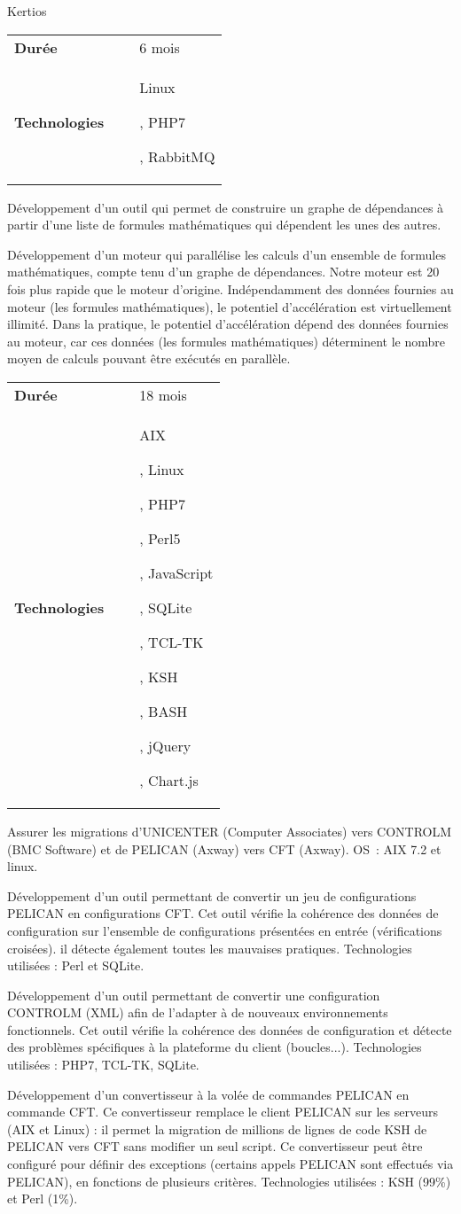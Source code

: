 \documentclass{cv}
\newlength{\hlengthCompanySection}
\newlength{\vlengthSectionTitleContent}
\newcommand{\fontTechnoDef}{\setmainfont[Ligatures=TeX]{Ubuntu Mono}}
\newenvironment{sectionComponent}{%
   \vspace{\vlengthSectionTitleContent}\par%
}{%
   \par%
}%
\newcommand{\realisationHeader}[2]{%
   \vspace{10pt}\par%
   \begin{tcolorbox}[notitle,
                     nobeforeafter, %
                     bottomrule=0pt,
                     toprule=0pt,
                     leftrule=2pt,
                     rightrule=0pt,
                     top=0pt,
                     bottom=0pt,
                     halign=left,
                     left=0pt,
                     valign=center,
                     width=\textwidth,
                     colback=white]%
      \begin{packed_tabular}%
         \begin{tabular}{lll}%
            \textbf{Durée}        & ~ & #1 \\
            \textbf{Technologies} & ~ & #2 \\
         \end{tabular}%
      \end{packed_tabular}%
   \end{tcolorbox}%
   \par%
}%
\newcommand{\sectionCompany}[1]{%
   \vspace{\vlengthSectionTitleContent}\par%
   \hspace{\hlengthCompanySection}\begin{tcolorbox}[notitle,
                      nobeforeafter, %
                      bottomrule=2pt,
                      toprule=0pt,
                      leftrule=0pt,
                      rightrule=0pt,
                      top=0pt,
                      bottom=0pt,
                      halign=left,
                      left=0pt,
                      valign=center,
                      colback={colorCompanySection},
                      width=\textwidth-\hlengthCompanySection]%
       #1%
   \end{tcolorbox}%
   \par%
}%
\newenvironment{technoEnv}{%
   \fontTechnoDef
}{}
\newcommand{\techno}[1]{%
   \begin{technoEnv}%
   #1%
   \end{technoEnv}\par%
}
\newenvironment{packed_tabular}{
   \setlength{\tabcolsep}{0pt}
}{}
\newenvironment{realisationEnv}{
   \setlength{\parskip}{1em}
}{%
   \par%
}
\begin{document}
   \begin{sectionComponent}
      \sectionCompany{Kertios}
   
      \realisationHeader{6 mois}{\techno{Linux}, \techno{PHP7}, \techno{RabbitMQ}}
   
      \begin{realisationEnv}
         Développement d'un outil qui permet de construire un graphe de dépendances à partir d'une liste de formules mathématiques qui dépendent les
         unes des autres.
   
         Développement d'un moteur qui parallélise les calculs d'un ensemble de formules mathématiques, compte tenu d'un graphe de dépendances.
         Notre moteur est 20 fois plus rapide que le moteur d'origine. Indépendamment des données fournies au moteur (les formules mathématiques),
         le potentiel d'accélération est virtuellement illimité. Dans la pratique, le potentiel d'accélération dépend des données fournies au moteur,
         car ces données (les formules mathématiques) déterminent le nombre moyen de calculs pouvant être exécutés en parallèle.
      \end{realisationEnv}
   
      \realisationHeader{18 mois}{\techno{AIX}, \techno{Linux}, \techno{PHP7}, \techno{Perl5}, \techno{JavaScript}, \techno{SQLite}, \techno{TCL-TK}, \techno{KSH}, \techno{BASH}, \techno{jQuery}, \techno{Chart.js}}
   
      \begin{realisationEnv}
         Assurer les migrations d'UNICENTER (Computer Associates) vers CONTROLM (BMC Software) et de PELICAN (Axway) vers CFT (Axway). OS : AIX 7.2
         et linux.
   
         Développement d'un outil permettant de convertir un jeu de configurations PELICAN en configurations CFT. Cet outil vérifie la cohérence des
         données de configuration sur l'ensemble de configurations présentées en entrée (vérifications croisées). il détecte également toutes les
         mauvaises pratiques. Technologies utilisées : Perl et SQLite.
   
         Développement d'un outil permettant de convertir une configuration CONTROLM (XML) afin de l'adapter à de nouveaux environnements fonctionnels.
         Cet outil vérifie la cohérence des données de configuration et détecte des problèmes spécifiques à la plateforme du client (boucles...).
         Technologies utilisées : PHP7, TCL-TK, SQLite.
   
         Développement d'un convertisseur à la volée de commandes PELICAN en commande CFT. Ce convertisseur remplace le client PELICAN sur les serveurs
         (AIX et Linux) : il permet la migration de millions de lignes de code KSH de PELICAN vers CFT sans modifier un seul script. Ce convertisseur
         peut être configuré pour définir des exceptions (certains appels PELICAN sont effectués via PELICAN), en fonctions de plusieurs critères.
         Technologies utilisées : KSH (99\%) et Perl (1\%). 
   

\end{realisationEnv}
\end{sectionComponent}
\end{document}
